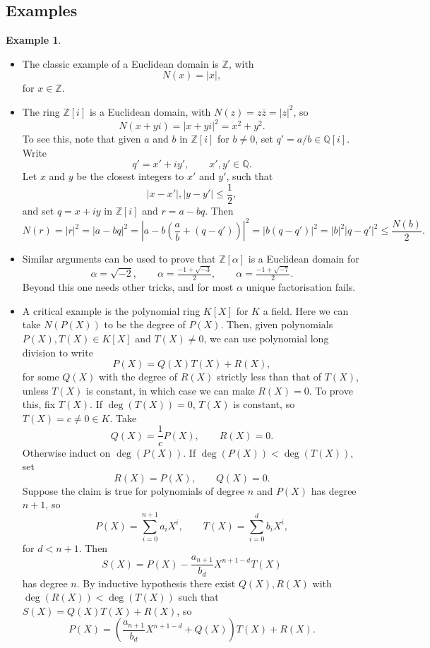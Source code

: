 \documentclass{article}
\newcommand{\Z}{\mathbb{Z}}
\newcommand{\Q}{\mathbb{Q}}
\newcommand{\rb}[1]{\left( #1 \right)}
\renewcommand{\sb}[1]{\left[ #1 \right]}
\newcommand{\abs}[1]{\left\lvert #1 \right\rvert}
\theoremstyle{definition}\newtheorem{definition}{Definition}[subsection]
\theoremstyle{definition}\newtheorem{remark}[definition]{Remark}
\theoremstyle{definition}\newtheorem*{example}{Example}
\theoremstyle{definition}\newtheorem*{note}{Note}
\begin{document}
\subsection{Examples}

\begin{example}
\hfill
\begin{itemize}
\item The classic example of a Euclidean domain is $ \Z $, with
$$ N\rb{x} = \abs{x}, $$
for $ x \in \Z $.
\item The ring $ \Z\sb{i} $ is a Euclidean domain, with $ N\rb{z} = z\overline{z} = \abs{z}^2 $, so
$$ N\rb{x + yi} = \abs{x + yi}^2 = x^2 + y^2. $$
To see this, note that given $ a $ and $ b $ in $ \Z\sb{i} $ for $ b \ne 0 $, set $ q' = a / b \in \Q\sb{i} $. Write
$$ q' = x' + iy', \qquad x', y' \in \Q. $$
Let $ x $ and $ y $ be the closest integers to $ x' $ and $ y' $, such that
$$ \abs{x - x'}, \abs{y - y'} \le \dfrac{1}{2}, $$
and set $ q = x + iy $ in $ \Z\sb{i} $ and $ r = a - bq $. Then
$$ N\rb{r} = \abs{r}^2 = \abs{a - bq}^2 = \abs{a - b\rb{\dfrac{a}{b} + \rb{q - q'}}}^2 = \abs{b\rb{q - q'}}^2 = \abs{b}^2\abs{q - q'}^2 \le \dfrac{N\rb{b}}{2}. $$
\item Similar arguments can be used to prove that $ \Z\sb{\alpha} $ is a Euclidean domain for
$$ \alpha = \sqrt{-2}, \qquad \alpha = \tfrac{-1 + \sqrt{-3}}{2}, \qquad \alpha = \tfrac{-1 + \sqrt{-7}}{2}. $$
Beyond this one needs other tricks, and for most $ \alpha $ unique factorisation fails.
\item A critical example is the polynomial ring $ K\sb{X} $ for $ K $ a field. Here we can take $ N\rb{P\rb{X}} $ to be the degree of $ P\rb{X} $. Then, given polynomials $ P\rb{X}, T\rb{X} \in K\sb{X} $ and $ T\rb{X} \ne 0 $, we can use polynomial long division to write
$$ P\rb{X} = Q\rb{X}T\rb{X} + R\rb{X}, $$
for some $ Q\rb{X} $ with the degree of $ R\rb{X} $ strictly less than that of $ T\rb{X} $, unless $ T\rb{X} $ is constant, in which case we can make $ R\rb{X} = 0 $. To prove this, fix $ T\rb{X} $. If $ \deg\rb{T\rb{X}} = 0 $, $ T\rb{X} $ is constant, so $ T\rb{X} = c \ne 0 \in K $. Take
$$ Q\rb{X} = \dfrac{1}{c}P\rb{X}, \qquad R\rb{X} = 0. $$
Otherwise induct on $ \deg\rb{P\rb{X}} $. If $ \deg\rb{P\rb{X}} < \deg\rb{T\rb{X}} $, set
$$ R\rb{X} = P\rb{X}, \qquad Q\rb{X} = 0. $$
Suppose the claim is true for polynomials of degree $ n $ and $ P\rb{X} $ has degree $ n + 1 $, so
$$ P\rb{X} = \sum_{i = 0}^{n + 1} a_iX^i, \qquad T\rb{X} = \sum_{i = 0}^d b_iX^i, $$
for $ d < n + 1 $. Then
$$ S\rb{X} = P\rb{X} - \dfrac{a_{n + 1}}{b_d}X^{n + 1 - d}T\rb{X} $$
has degree $ n $. By inductive hypothesis there exist $ Q\rb{X}, R\rb{X} $ with $ \deg\rb{R\rb{X}} < \deg\rb{T\rb{X}} $ such that $ S\rb{X} = Q\rb{X}T\rb{X} + R\rb{X} $, so
$$ P\rb{X} = \rb{\dfrac{a_{n + 1}}{b_d}X^{n + 1 - d} + Q\rb{X}}T\rb{X} + R\rb{X}. $$
\end{itemize}
\end{example}
\end{document}
